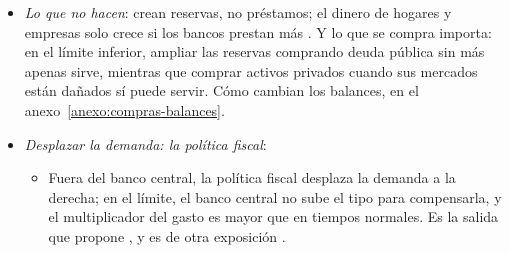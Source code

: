 \documentclass[11pt]{article}
\begin{document}
\begin{itemize}
\begin{itemize}
\begin{itemize}
  \item el de \emph{liquidez}: en un pánico, como en 2008 o en marzo de 2020, el banco central compra lo que nadie quiere y baja las primas de liquidez; es cuando las compras son más eficaces\nocite{Bernanke2020New};
  \item el del \emph{crédito y el capital de los bancos}: suben los precios de los activos que tienen los bancos y el banco central sustituye a los que no pueden prestar\nocite{GertlerKaradi2011Unconventional} (\ref{sec:fricciones});
  \item el del \emph{tipo de cambio y la riqueza}: con tipos más bajos se deprecia la moneda y suben las acciones y la vivienda (\ref{sec:canales}); las compras de la Reserva Federal y del BCE movieron el dólar y el euro\nocite{DedolaEtAl2021}.
  \end{itemize}
\item \emph{Lo que no hacen}: crean reservas, no préstamos; el dinero de hogares y empresas solo crece si los bancos prestan más . Y lo que se compra importa: en el límite inferior, ampliar las reservas comprando deuda pública sin más apenas sirve, mientras que comprar activos privados cuando sus mercados están dañados sí puede servir\nocite{CurdiaWoodford2011Balance}. Cómo cambian los balances, en el anexo~\ref{anexo:compras-balances}.
  \end{itemize}
\end{itemize}

\begin{itemize}
\item \emph{Desplazar la demanda: la política fiscal}:
  \begin{itemize}
\item Fuera del banco central, la política fiscal desplaza la demanda a la derecha; en el límite, el banco central no sube el tipo para compensarla, y el multiplicador del gasto es mayor que en tiempos normales\nocite{Eggertsson2011Fiscal}. Es la salida que propone , y es de otra exposición .
  \end{itemize}
\end{itemize}
\end{document}
